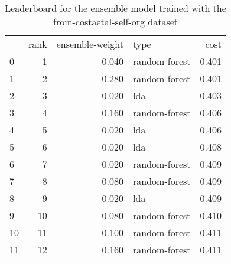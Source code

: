 \begin{table}[]
	\centering
	\begin{tabular}{lrrlr}
		   & rank & ensemble-weight & type          & cost  \\
		0  & 1    & 0.040           & random-forest & 0.401 \\
		1  & 2    & 0.280           & random-forest & 0.401 \\
		2  & 3    & 0.020           & lda           & 0.403 \\
		3  & 4    & 0.160           & random-forest & 0.406 \\
		4  & 5    & 0.020           & lda           & 0.406 \\
		5  & 6    & 0.020           & lda           & 0.408 \\
		6  & 7    & 0.020           & random-forest & 0.409 \\
		7  & 8    & 0.080           & random-forest & 0.409 \\
		8  & 9    & 0.020           & lda           & 0.409 \\
		9  & 10   & 0.080           & random-forest & 0.410 \\
		10 & 11   & 0.100           & random-forest & 0.411 \\
		11 & 12   & 0.160           & random-forest & 0.411 \\
	\end{tabular}

	\caption{Leaderboard for the ensemble model trained with the from-costaetal-self-org dataset}
	\label{tab:lb-from-costaetal-self-org-randsplit}
\end{table}

